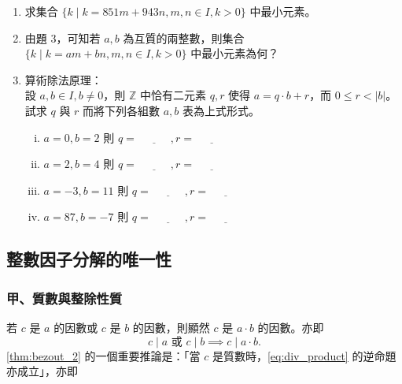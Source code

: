\begin{enumerate}[1.]
  \item 求集合 $\{k \mid k = 851m + 943n, m, n \in I, k > 0\}$ 中最小元素。

  \item 由題 3，可知若 $a, b$ 為互質的兩整數，則集合 $\{k \mid k = am + bn, m, n \in I, k > 0\}$ 中最小元素為何？

  \item 算術除法原理：\\
  設 $a, b \in I, b \neq 0$，則 $\mathbb{Z}$ 中恰有二元素 $q, r$ 使得 $a = q \cdot b + r$，而 $0 \le r < |b|$。\\
  試求 $q$ 與 $r$ 而將下列各組數 $a, b$ 表為上式形式。
  \begin{enumerate}[(i)]
    \item $a=0, b=2$ 則 $q = \underline{\hspace{3em}}, r = \underline{\hspace{3em}}$
    \item $a=2, b=4$ 則 $q = \underline{\hspace{3em}}, r = \underline{\hspace{3em}}$
    \item $a=-3, b=11$ 則 $q = \underline{\hspace{3em}}, r = \underline{\hspace{3em}}$
    \item $a=87, b=-7$ 則 $q = \underline{\hspace{3em}}, r = \underline{\hspace{3em}}$
  \end{enumerate}
\end{enumerate}

\subsection{整數因子分解的唯一性}\label{sec:6-3}

\subsubsection*{甲、質數與整除性質}\label{subsec:6-3-a}

若 $c$ 是 $a$ 的因數或 $c$ 是 $b$ 的因數，則顯然 $c$ 是 $a \cdot b$ 的因數。亦即
\begin{equation}
  c \mid a \text{ 或 } c \mid b \implies c \mid a \cdot b. \label{eq:div_product}
\end{equation}
\cref{thm:bezout_2} 的一個重要推論是：「當 $c$ 是質數時，\eqref{eq:div_product} 的逆命題亦成立」，亦即

